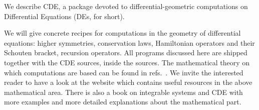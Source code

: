 


\newcommand{\cprime}{\/{\mathsurround=0pt$'$}}

\newcommand{\cde}{CDE\xspace}
\newcommand{\cdiff}{CDIFF\xspace}
\newcommand{\crack}{CRACK\xspace}
\newcommand{\cdiffop}{$\mathcal{C}$-differential operator\xspace}
\newcommand{\cdiffops}{$\mathcal{C}$-differential operators\xspace}

\ifdefined{}\else
\newcommand*{\pd}[2]{\mathchoice{\frac{\partial#1}{\partial#2}}
  {\partial#1/\partial#2}{\partial#1/\partial#2}
  {\partial#1/\partial#2}}
\newcommand*{\od}[2]{\mathchoice{\frac{d#1}{d#2}}
  {d#1/d#2}{d#1/d#2}{d#1/d#2}}
\newcommand*{\fd}[2]{\mathchoice{\frac{\delta#1}{\delta#2}}
  {\delta #1/\delta#2}{\delta#1/\delta#2}{\delta#1/\delta#2}}

\newcommand{\N}{\mathbb{N}}
\newcommand{\R}{\mathbb{R}}
\newcommand{\Z}{\mathbb{Z}}

\newcommand{\CDiff}{\mathop{\mathcal{C}\mathrm{Dif{}f}}}
\newcommand*{\CDiffsym}[1]{\CDiff_{(#1)}^{\,\mathrm{sym}}}
\newcommand*{\CDiffself}[1]{\CDiff_{(#1)}^{\,\mathrm{self}}}
\newcommand*{\CDiffskew}[1]{\CDiff_{(#1)}^{\,\mathrm{skew}}}

\newcommand{\ddx}[1]{D_x^{#1}}
\fi
We describe \cde, a \REDUCE package devoted to differential-geometric
computations on Differential Equations (DEs, for short).

We will give concrete recipes for computations in the geometry of
differential equations: higher symmetries, conservation laws, Hamiltonian
operators and their Schouten bracket, recursion operators. All programs
discussed here are shipped together with the \cde sources, inside the \REDUCE
sources. The mathematical theory on which
computations are based can be found in refs.~\cite{Krasilshchik:99,KerstenKrasilshchikVerboretsky:2004}. We invite the
interested reader to have a look at the website \cite{gdeq} which contains
useful resources in the above mathematical area. There is also a book on integrable systems
and \cde \cite{KrasilshchikVerbovetskyVitolo:2018} with more examples and
more detailed explanations about the mathematical part.

